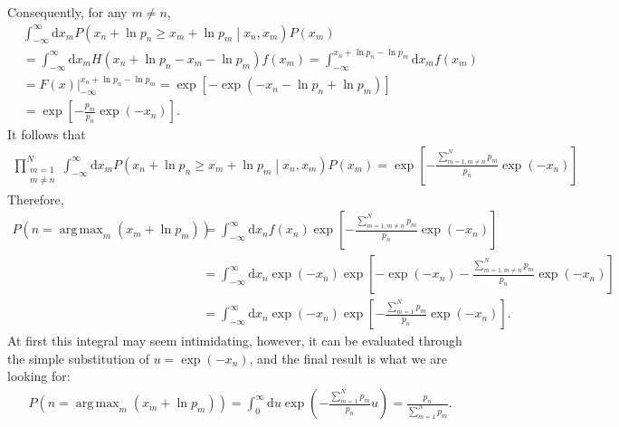 \documentclass{book}[12pt]
\DeclareMathOperator*{\argmax}{arg\,max}
\begin{document}
Consequently, for any $m\neq n$,
\begin{align}
     & \int_{-\infty}^\infty\mathrm{d}x_m P\left(x_n+\ln p_n\geq x_m+\ln p_m\middle|x_n,x_m\right) P\left(x_m\right)\nonumber \\
     & =\int_{-\infty}^\infty\mathrm{d}x_m H(x_n+\ln p_n-x_m-\ln p_m) f\left(x_m\right)
    =\int_{-\infty}^{x_n+\ln p_n-\ln p_m}\mathrm{d}x_m f\left(x_m\right)\nonumber                                             \\
     & =F\left(x\right)\Big|_{-\infty}^{x_n+\ln p_n-\ln p_m}=\exp\left[-\exp\left(-x_n-\ln p_n+\ln p_m\right)\right]\nonumber \\
     & =\exp\left[-\frac{p_m}{p_n}\exp\left(-x_n\right)\right].
\end{align}
It follows that
\begin{align}
    \prod_{\substack{m=1 \\m\neq n}}^N\int_{-\infty}^\infty\mathrm{d}x_m P\left(x_n+\ln p_n\geq x_m+\ln p_m\middle|x_n,x_m\right) P\left(x_m\right)
    =\exp\left[-\frac{\sum_{m=1,m\neq n}^N p_m}{p_n}\exp\left(-x_n\right)\right]
\end{align}
Therefore,
\begin{align}
    P\left(n=\argmax_m\left(x_m+\ln p_m\right)\right)
     & =\int_{-\infty}^\infty\mathrm{d}x_n f\left(x_n\right) \exp\left[-\frac{\sum_{m=1,m\neq n}^N p_m}{p_n}\exp\left(-x_n\right)\right]\nonumber                           \\
     & =\int_{-\infty}^\infty\mathrm{d}x_n \exp\left(-x_n\right) \exp\left[-\exp\left(-x_n\right)-\frac{\sum_{m=1,m\neq n}^N p_m}{p_n}\exp\left(-x_n\right)\right]\nonumber \\
     & =\int_{-\infty}^\infty\mathrm{d}x_n \exp\left(-x_n\right) \exp\left[-\frac{\sum_{m=1}^N p_m}{p_n}\exp\left(-x_n\right)\right].
\end{align}
At first this integral may seem intimidating, however, it can be evaluated through the simple substitution of $u=\exp\left(-x_n\right)$, and the final result is what we are looking for:
\begin{align}
     & P\left(n=\argmax_m\left(x_m+\ln p_m\right)\right)=\int_0^\infty\mathrm{d}u \exp\left(-\frac{\sum_{m=1}^N p_m}{p_n}u\right)=\frac{p_n}{\sum_{m=1}^N p_m}.\label{eq:result}
\end{align}
\end{document}
